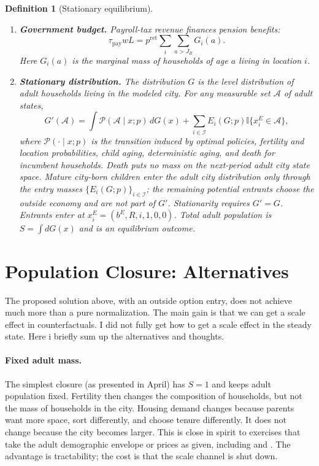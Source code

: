\documentclass[11pt]{article}
\newtheorem{definition}{Definition}
\newcommand{\ind}{\mathbb{I}}
\newcommand{\Iset}{\mathcal I}
\begin{document}
\begin{definition}[Stationary equilibrium]
\begin{enumerate}[leftmargin=*]
    \item \textbf{Government budget.} Payroll-tax revenue finances pension benefits:
    \begin{equation*}
        \tau_{\mathrm{pay}} w L
        =
        p^{\mathrm{ret}}\sum_i\sum_{a>J_R}G_i(a).
    \end{equation*}
    Here $G_i(a)$ is the marginal mass of households of age $a$ living in location $i$.

    \item \textbf{Stationary distribution.} The distribution $G$ is the level distribution of adult households living in the modeled city. For any measurable set $\mathcal A$ of adult states,
    \begin{equation*}
        G'(\mathcal A)
        =
        \int \mathcal P(\mathcal A\mid x;p)\,dG(x)
        +
        \sum_{i\in\Iset}E_i(G;p)\ind\{x_i^E\in\mathcal A\},
    \end{equation*}
    where $\mathcal P(\cdot\mid x;p)$ is the transition induced by optimal policies, fertility and location probabilities, child aging, deterministic aging, and death for incumbent households. Death puts no mass on the next-period adult city state space. Mature city-born children enter the adult city distribution only through the entry masses $\{E_i(G;p)\}_{i\in\Iset}$; the remaining potential entrants choose the outside economy and are not part of $G'$. Stationarity requires $G'=G$. Entrants enter at $x_i^E=(b^E,R,i,1,0,0)$. Total adult population is $S=\int dG(x)$ and is an equilibrium outcome.
\end{enumerate}
\end{definition}

\section{Population Closure: Alternatives}
The proposed solution above, with an outside option entry, does not achieve much more than a pure normalization. The main gain is that we can get a scale effect in counterfactuals. I did not fully get how to get a scale effect in the steady state. Here i briefly sum up the alternatives and thoughts.
\paragraph{Fixed adult mass.}
The simplest closure (as presented in April) has $S=1$ and keeps adult population fixed. Fertility then changes the composition of households, but not the mass of households in the city. Housing demand changes because parents want more space, sort differently, and choose tenure differently. It does not change because the city becomes larger. This is close in spirit to exercises that take the adult demographic envelope or prices as given, including \citet{morenoMaldonadoSantamariaDelayed2024} and \citet{karabarbounisNordFertilityChoicesCost2025}. The advantage is tractability; the cost is that the scale channel is shut down.
\end{document}
